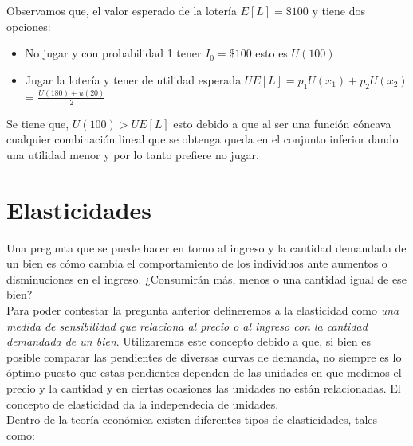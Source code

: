 Observamos que, el valor esperado de la lotería $E[L] = \$100$ y tiene dos opciones:

\begin{itemize}
    \item No jugar y con probabilidad 1 tener $I_0 = \$100$ esto es $U(100)$
    \item Jugar la lotería y tener de utilidad esperada $UE[L] = p_1U(x_1) + p_2U(x_2)$ = $\frac{U(180)+u(20)}{2}$
\end{itemize} 

\newpage

Se tiene que, $U(100) > UE[L]$ esto debido a que al ser una función cóncava cualquier combinación lineal que se obtenga queda en el conjunto inferior dando una utilidad menor y por lo tanto prefiere no jugar. \\


\newpage

\section{Elasticidades}
\noindent Una pregunta que se puede hacer en torno al ingreso y la cantidad demandada de un bien es cómo cambia el comportamiento de los individuos ante aumentos o disminuciones en el ingreso. ¿Consumirán más, menos o una cantidad igual de ese bien? \\

Para poder contestar la pregunta anterior defineremos a la elasticidad como \textit{una medida de sensibilidad que relaciona al precio o al ingreso con la cantidad demandada de un bien}. Utilizaremos este concepto debido a que, si bien es posible comparar las pendientes de diversas curvas de demanda, no siempre es lo óptimo puesto que estas pendientes dependen de las unidades en que medimos el precio y la cantidad y en ciertas ocasiones las unidades no están relacionadas. El concepto de elasticidad da la independecia de unidades. \\ 

Dentro de la teoría económica existen diferentes tipos de elasticidades, tales como: 

